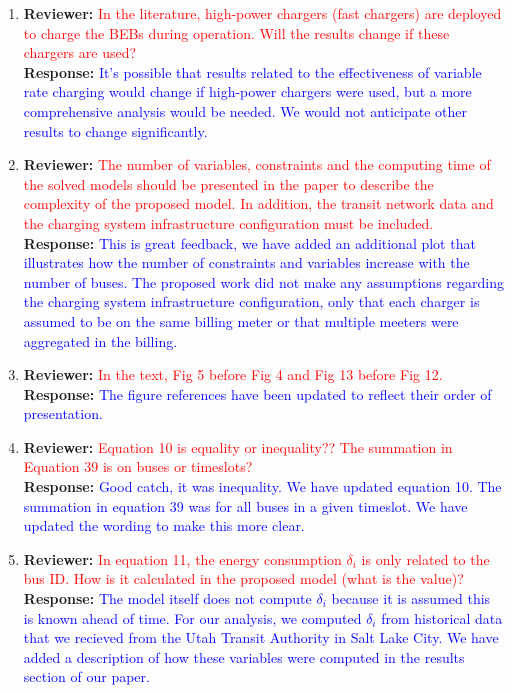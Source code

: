 \documentclass{article}
\newcommand\formatfeedback[2]
{%
	\textbf{Reviewer:} \textcolor{red}{#1} 
	\leavevmode\\[0.1in] \textbf{Response:} \textcolor{blue}{#2}
}
\begin{document}
\begin{enumerate}
	\item \formatfeedback{In the literature, high-power chargers (fast chargers) are deployed to charge the BEBs during
operation. Will the results change if these chargers are used?}{It's possible that results related to the effectiveness of variable rate charging would change if high-power chargers were used, but a more comprehensive analysis would be needed. We would not anticipate other results to change significantly.}
	\item \formatfeedback{The number of variables, constraints and the computing time of the solved models should be
presented in the paper to describe the complexity of the proposed model. In addition, the transit
network data and the charging system infrastructure configuration must be included.}{This is great feedback, we have added an additional plot that illustrates how the number of constraints and variables increase with the number of buses. The proposed work did not make any assumptions regarding the charging system infrastructure configuration, only that each charger is assumed to be on the same billing meter or that multiple meeters were aggregated in the billing.}
	\item \formatfeedback{In the text, Fig 5 before Fig 4 and Fig 13 before Fig 12.}{The figure references have been updated to reflect their order of presentation.}
	\item \formatfeedback{Equation 10 is equality or inequality?? The summation in Equation 39 is on buses or timeslots?}{Good catch, it was inequality.  We have updated equation 10. The summation in equation 39 was for all buses in a given timeslot. We have updated the wording to make this more clear.}
	\item \formatfeedback{In equation 11, the energy consumption $\delta_i$ is only related to the bus ID. How is it calculated in
the proposed model (what is the value)?}{The model itself does not compute $\delta_i$ because it is assumed this is known ahead of time. For our analysis, we computed $\delta_i$ from historical data that we recieved from the Utah Transit Authority in Salt Lake City. We have added a description of how these variables were computed in the results section of our paper.}
\end{enumerate}
\end{document}
